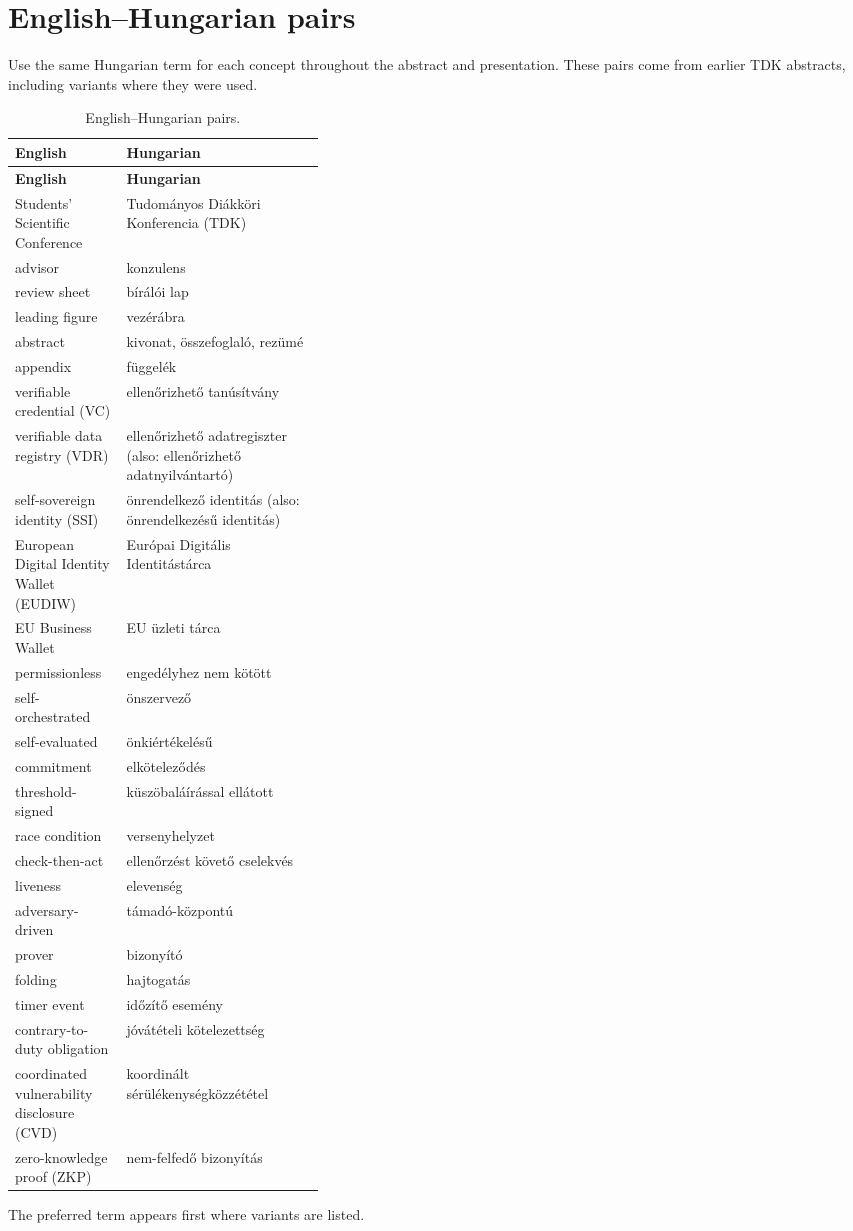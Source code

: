 \section{English--Hungarian pairs}
Use the same Hungarian term for each concept throughout the abstract and presentation. These pairs come from earlier TDK abstracts, including variants where they were used.
{\small
\begin{xltabular}{\linewidth}{>{\raggedright\arraybackslash}p{0.36\linewidth} >{\raggedright\arraybackslash}X}
  \caption{English--Hungarian pairs.}\label{guide:tab:glossary-hu}\\
  \toprule \textbf{English} & \textbf{Hungarian} \\ \midrule \endfirsthead
  \toprule \textbf{English} & \textbf{Hungarian} \\ \midrule \endhead
  \bottomrule \endlastfoot
  Students' Scientific Conference & Tudományos Diákköri Konferencia (TDK) \\
  advisor & konzulens \\
  review sheet & bírálói lap \\
  leading figure & vezérábra \\
  abstract & kivonat, összefoglaló, rezümé \\
  appendix & függelék \\
  verifiable credential (VC) & ellenőrizhető tanúsítvány \\
  verifiable data registry (VDR) & ellenőrizhető adatregiszter (also: ellenőrizhető adatnyilvántartó) \\
  self-sovereign identity (SSI) & önrendelkező identitás (also: önrendelkezésű identitás) \\
  European Digital Identity Wallet (EUDIW) & Európai Digitális Identitástárca \\
  EU Business Wallet & EU üzleti tárca \\
  permissionless & engedélyhez nem kötött \\
  self-orchestrated & önszervező \\
  self-evaluated & önkiértékelésű \\
  commitment & elköteleződés \\
  threshold-signed & küszöbaláírással ellátott \\
  race condition & versenyhelyzet \\
  check-then-act & ellenőrzést követő cselekvés \\
  liveness & elevenség \\
  adversary-driven & támadó-központú \\
  prover & bizonyító \\
  folding & hajtogatás \\
  timer event & időzítő esemény \\
  contrary-to-duty obligation & jóvátételi kötelezettség \\
  coordinated vulnerability disclosure (CVD) & koordinált sérülékenységközzététel \\
  zero-knowledge proof (ZKP) & nem-felfedő bizonyítás \\
\end{xltabular}
}
The preferred term appears first where variants are listed.
